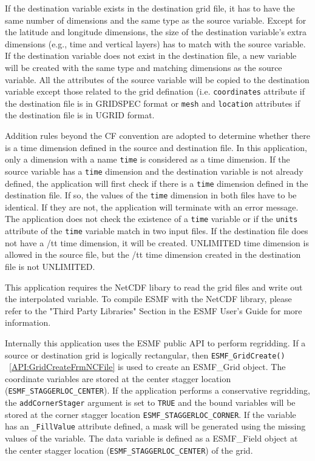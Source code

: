 If the destination 
variable exists in the destination grid file, it has to have the same number of dimensions and the same type as the source variable. Except for the latitude and longitude dimensions, the size of 
the destination variable's extra dimensions (e.g., time and vertical layers) has to match with the 
source variable.   If the destination variable does not exist in the destination file, a 
new variable will be created with the same type and matching dimensions as the source variable. 
All the attributes of the source variable will be copied to the destination variable except those
related to the grid defination (i.e. {\tt coordinates} attribute if the destination file is in  
GRIDSPEC format or {\tt mesh} and {\tt location} attributes if the destination file is in UGRID format.

Addition rules beyond the CF convention are adopted to determine whether there is a time dimension defined
in the source and destination file.  In this application, only a dimension with a name {\tt time} is 
considered as a time dimension.
If the source variable has a {\tt time} dimension and the destination variable is not already defined, 
the application will first check if there is a {\tt time} dimension defined in the destination file.  If so, 
the values of the {\tt time} dimension in both files have to be identical.  If they are not, the application
will terminate with an error message.  The application does not check the existence of a {\tt time} variable 
or if the {\tt units} attribute of the {\tt time} variable match in two input files.  If the destination 
file does not have a {/tt time} dimension, it will be created.  UNLIMITED time dimension is allowed in the
source file, but the {/tt time} dimension created in the destination file is not UNLIMITED.

This application requires the NetCDF libary to read the grid files and write out the interpolated variable.  To compile ESMF with
the NetCDF library, please refer to the "Third Party Libraries" Section in the ESMF User's Guide for more information.

Internally this application uses the ESMF public API to perform regridding.
If a source or destination grid is logically rectangular, then {\tt ESMF\_GridCreate()}
~\ref{API:GridCreateFrmNCFile} is used to create an ESMF\_Grid object. The coordinate variables are stored
at the center stagger location ({\tt ESMF\_STAGGERLOC\_CENTER}).  If the application performs a 
conservative regridding, the {\tt addCornerStager} argument is set to {\tt TRUE} and the bound variables will
be stored at the corner stagger location {\tt ESMF\_STAGGERLOC\_CORNER}.  If the variable has an {\tt \_FillValue} attribute defined, a mask will be generated using the missing values of the variable. 
The data variable is defined as a ESMF\_Field object at the center stagger location ({\tt ESMF\_STAGGERLOC\_CENTER}) of the grid.   

